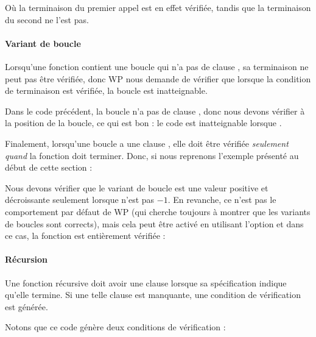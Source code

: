 

Où la terminaison du premier appel est en effet vérifiée, tandis que la
terminaison du second ne l'est pas.


\paragraph{Variant de boucle}


Lorsqu'une fonction contient une boucle qui n'a pas de clause
, sa terminaison ne peut pas être vérifiée, donc WP
nous demande de vérifier que lorsque la condition de terminaison est vérifiée,
la boucle est inatteignable.




Dans le code précédent, la boucle n'a pas de clause ,
donc nous devons vérifier  à
la position de la boucle, ce qui est bon : le code est inatteignable lorsque
.


Finalement, lorsqu'une boucle a une clause , elle doit
être vérifiée \textit{seulement quand} la fonction doit terminer. Donc, si nous
reprenons l'exemple présenté au début de cette section :




Nous devons vérifier que le variant de boucle est une valeur positive et
décroissante seulement lorsque  n'est pas $-1$. En
revanche, ce n'est pas le comportement par défaut de WP (qui cherche toujours à
montrer que les variants de boucles sont corrects), mais cela peut être
activé en utilisant l'option  et dans
ce cas, la fonction est entièrement vérifiée :




\paragraph{Récursion}


Une fonction récursive doit avoir une clause  lorsque sa
spécification indique qu'elle termine. Si une telle clause est manquante, une
condition de vérification  est générée.




Notons que ce code génère deux conditions de vérification :


